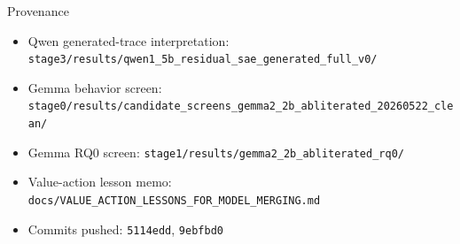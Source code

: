 \documentclass[aspectratio=169]{beamer}
\begin{document}
\begin{frame}{Provenance}
  \small
  \begin{itemize}
    \item Qwen generated-trace interpretation: \texttt{stage3/results/qwen1\_5b\_residual\_sae\_generated\_full\_v0/}
    \item Gemma behavior screen: \texttt{stage0/results/candidate\_screens\_gemma2\_2b\_abliterated\_20260522\_clean/}
    \item Gemma RQ0 screen: \texttt{stage1/results/gemma2\_2b\_abliterated\_rq0/}
    \item Value-action lesson memo: \texttt{docs/VALUE\_ACTION\_LESSONS\_FOR\_MODEL\_MERGING.md}
    \item Commits pushed: \texttt{5114edd}, \texttt{9ebfbd0}
  \end{itemize}
\end{frame}
\end{document}

